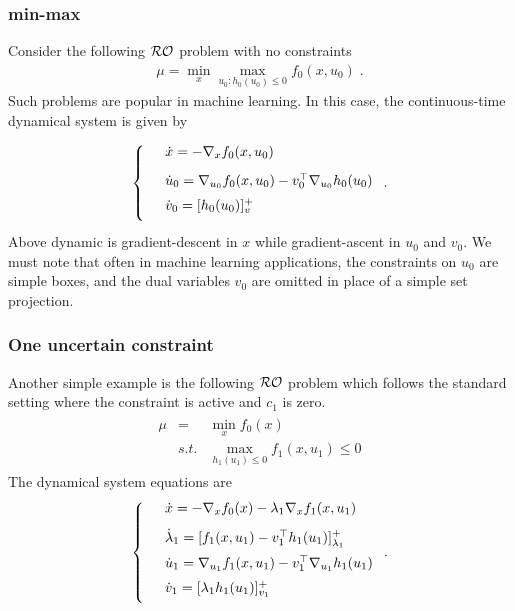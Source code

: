 \documentclass[journal,twoside,web]{ieeecolor}
\begin{document}
\subsubsection{min-max} Consider the following ${\cal RO}$ problem with no constraints
\begin{align*}
\mu=\min_x\max_{u_0:h_0(u_0)\leq 0}f_0(x,u_0)\;.
\end{align*}
Such problems are popular in machine learning. In this case, the continuous-time dynamical system is given by

\begin{align*}
\left\{
\begin{array}{cl}
\vspace{3mm}
&\dot{x}=-\nabla_x f_0(x,u_0)\\
\vspace{2mm}
&\dot{u}_0=\nabla_{u_0}f_0(x,u_0)-v_0^\top \nabla_{u_0} h_0(u_0)\\
\vspace{2mm}
&\dot{v}_0=[h_0(u_0)]_v^+
\end{array}\right..
\end{align*}
Above dynamic is gradient-descent in $x$ while gradient-ascent in $u_0$ and $v_0$. We must note that often in machine learning applications, the constraints on $u_0$ are simple boxes, and the dual variables $v_0$ are omitted in place of a simple set projection.

\subsubsection{One uncertain constraint}
Another simple example is the following ${\cal RO}$ problem which follows the standard setting where the constraint is active and $c_1$ is zero.
\begin{align*}
\begin{array}{lcl}\mu&=&\displaystyle\min_x f_0(x)\\
&s.t.&\displaystyle \max_{h_1(u_1)\leq 0}f_1(x,u_1)\leq 0
\end{array}
\end{align*}
The dynamical system equations are
\begin{align*}
\left\{
\begin{array}{cl}
\vspace{3mm}
&\dot{x}=-\nabla_x f_0(x)-\lambda_1 \nabla_x f_1(x,u_1)\\
\vspace{2mm}
&\dot{\lambda}_1=[f_1(x,u_1)-v_1^\top h_1(u_1)]_{\lambda_1}^+\\
\vspace{2mm}
&\dot{u}_1=\nabla_{u_1} f_1(x,u_1)-v_1^\top \nabla_{u_1}h_1(u_1)\\
\vspace{2mm}
&\dot{v}_1=[\lambda_1h_1(u_1)]_{v_1}^+
\end{array}\right..
\end{align*}
\end{document}
